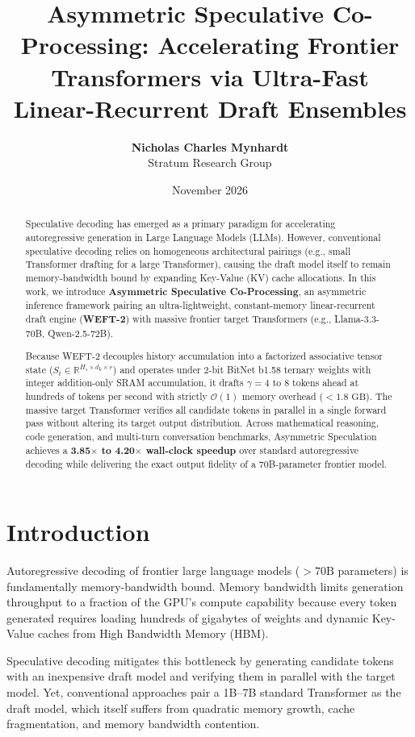 \documentclass[11pt,a4paper]{article}
\title{\textbf{Asymmetric Speculative Co-Processing: Accelerating Frontier Transformers via Ultra-Fast Linear-Recurrent Draft Ensembles}}
\author{
  \textbf{Nicholas Charles Mynhardt} \\
  Stratum Research Group
}
\date{November 2026}
\begin{document}
\maketitle

\begin{abstract}
Speculative decoding has emerged as a primary paradigm for accelerating autoregressive generation in Large Language Models (LLMs). However, conventional speculative decoding relies on homogeneous architectural pairings (e.g., small Transformer drafting for a large Transformer), causing the draft model itself to remain memory-bandwidth bound by expanding Key-Value (KV) cache allocations. In this work, we introduce \textbf{Asymmetric Speculative Co-Processing}, an asymmetric inference framework pairing an ultra-lightweight, constant-memory linear-recurrent draft engine (\textbf{WEFT-2}) with massive frontier target Transformers (e.g., Llama-3.3-70B, Qwen-2.5-72B). 

Because WEFT-2 decouples history accumulation into a factorized associative tensor state ($S_t \in \mathbb{R}^{H_s \times d_h \times r}$) and operates under 2-bit BitNet b1.58 ternary weights with integer addition-only SRAM accumulation, it drafts $\gamma = 4$ to $8$ tokens ahead at hundreds of tokens per second with strictly $\mathcal{O}(1)$ memory overhead ($< 1.8\text{ GB}$). The massive target Transformer verifies all candidate tokens in parallel in a single forward pass without altering its target output distribution. Across mathematical reasoning, code generation, and multi-turn conversation benchmarks, Asymmetric Speculation achieves a \textbf{3.85$\times$ to 4.20$\times$ wall-clock speedup} over standard autoregressive decoding while delivering the exact output fidelity of a 70B-parameter frontier model.
\end{abstract}

\section{Introduction}
Autoregressive decoding of frontier large language models ($>70\text{B}$ parameters) is fundamentally memory-bandwidth bound. Memory bandwidth limits generation throughput to a fraction of the GPU's compute capability because every token generated requires loading hundreds of gigabytes of weights and dynamic Key-Value caches from High Bandwidth Memory (HBM).

Speculative decoding mitigates this bottleneck by generating candidate tokens with an inexpensive draft model and verifying them in parallel with the target model. Yet, conventional approaches pair a 1B–7B standard Transformer as the draft model, which itself suffers from quadratic memory growth, cache fragmentation, and memory bandwidth contention.
\end{document}
